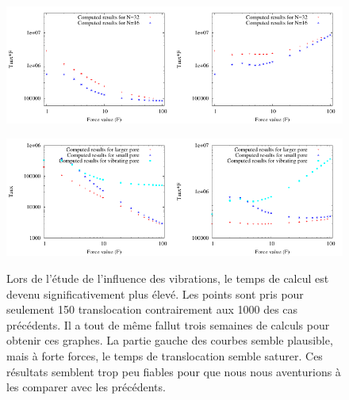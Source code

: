 \documentclass[a4paper,11pt]{article}
\begin{document}
\begin{figure}[H]
\begin{center}
\includegraphics[width=0.5\textwidth]{translocvibf.pdf}\includegraphics[width=0.5\textwidth]{translocvib.pdf}

\includegraphics[width=0.5\textwidth]{translocporedifnbackup.pdf}\includegraphics[width=0.5\textwidth]{translocporedifbackup.pdf}
\caption{Lors de l'étude de l'influence des vibrations, le temps de calcul est devenu significativement plus élevé. Les points sont pris pour seulement 150 translocation contrairement aux 1000 des cas précédents. Il a tout de même fallut trois semaines de calculs pour obtenir ces graphes. La partie gauche des courbes semble plausible, mais à forte forces, le temps de translocation semble saturer. Ces résultats semblent trop peu fiables pour que nous nous aventurions à les comparer avec les précédents.}
\label{surprise}
\end{center}
\end{figure}
\end{document}
